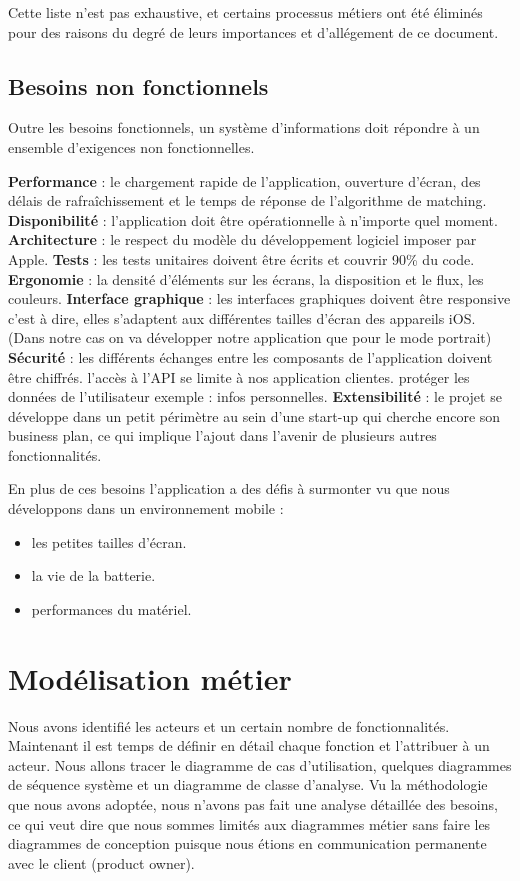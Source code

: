 Cette liste n'est pas exhaustive, et certains processus métiers ont été éliminés pour des raisons du degré de leurs importances et d’allégement de ce document.

\subsection{Besoins non fonctionnels} %
\label{sub:besoins_non_fonctionnels}
Outre les besoins fonctionnels, un système d'informations doit répondre à un ensemble d'exigences non fonctionnelles.
\begin{itemize}
	\itemb \textbf{Performance} : le chargement rapide de l’application, ouverture d’écran, des délais de rafraîchissement et le temps de réponse de l'algorithme de matching.
	\itemb \textbf{Disponibilité} : l'application doit être opérationnelle à n'importe quel moment.
	\itemb \textbf{Architecture} : le respect du modèle du développement logiciel imposer par Apple.
	\itemb \textbf{Tests} : les tests unitaires doivent être écrits et couvrir 90\% du code.
	\itemb \textbf{Ergonomie} : la densité d’éléments sur les écrans, la disposition et le flux, les couleurs.
	\itemb \textbf{Interface graphique} : les interfaces graphiques doivent être responsive c'est à dire, elles s'adaptent aux différentes tailles d’écran des appareils iOS. (Dans notre cas on va développer notre application que pour le mode portrait)
	\itemb \textbf{Sécurité} : les différents échanges entre les composants de l'application doivent être chiffrés. l’accès à l'API se limite à nos application clientes. protéger les données de l'utilisateur exemple : infos personnelles.
	\itemb \textbf{Extensibilité} : le projet se développe dans un petit périmètre au sein d'une start-up qui cherche encore son business plan, ce qui implique l'ajout dans l'avenir de plusieurs autres fonctionnalités.
\end{itemize}
En plus de ces besoins l'application a des défis à surmonter vu que nous développons dans un environnement mobile : 
\begin{itemize}
	\item les petites tailles d’écran.
	\item la vie de la batterie.
	\item performances du matériel.
\end{itemize}

\section{Modélisation métier}
Nous avons identifié les acteurs et un certain nombre de fonctionnalités. Maintenant il est temps de définir en détail chaque fonction et l'attribuer à un acteur.
Nous allons tracer le diagramme de cas d'utilisation, quelques diagrammes de séquence système et un diagramme de classe d'analyse.\newline
Vu la méthodologie que nous avons adoptée, nous n’avons pas fait une analyse détaillée des besoins, ce qui veut dire que nous sommes limités aux diagrammes métier sans faire les diagrammes de conception puisque nous étions en communication permanente avec le client (product owner).

